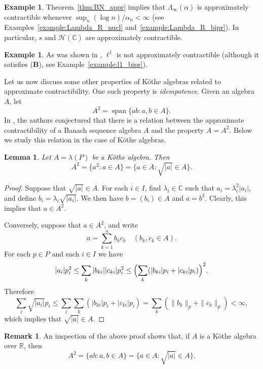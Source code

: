 \documentclass[12pt,reqno]{amsart}
\newtheorem{lemma}[theorem]{Lemma}
\theoremstyle{definition}
\newtheorem{example}[theorem]{Example}
\newtheorem{remark}[theorem]{Remark}
\begin{document}
\begin{example}
Theorem~\ref{thm:BN_appr} implies that
$\Lambda_\infty(\alpha)$ is approximately contractible whenever
$\sup_n (\log n)/\alpha_n<\infty$
(see Examples~\ref{example:Lambda_R_nucl} and~\ref{example:Lambda_R_bipr}).
In particular, $s$ and ${\mathscr H}({\mathbb C})$ are approximately contractible.
\end{example}

\begin{example}
As was shown in \cite{DLZ}, $\ell^1$ is not approximately contractible
(although it satisfies ({\textbf{B}}), see Example~\ref{example:l1_bipr}).
\end{example}

Let us now discuss some other properties of K\"othe algebras
related to approximate contractibility. One such property
is {\em idempotence}. Given an algebra $A$, let
\[
A^2=\operatorname{span}\{ ab : a,b\in A\}.
\]
In \cite{DLZ}, the authors conjectured that there is a relation
between the approximate contractibility of a Banach sequence algebra $A$
and the property $A=A^2$. Below we study this relation in the case
of K\"othe algebras.

\begin{lemma}
\label{lemma:A=A^2}
Let $A=\lambda(P)$ be a K\"othe algebra. Then
\[
A^2=\{ a^2 : a\in A\}=\{ a\in A : \sqrt{|a|}\in A\}.
\]
\end{lemma}
\begin{proof}
Suppose that $\sqrt{|a|}\in A$. For each $i\in I$, find $\lambda_i\in{\mathbb C}$
such that $a_i=\lambda_i^2 |a_i|$, and define $b_i=\lambda_i\sqrt{|a_i|}$.
We then have $b=(b_i)\in A$ and $a=b^2$. Clearly, this implies that $a\in A^2$.

Conversely, suppose that $a\in A^2$, and write
\[
a=\sum_{k=1}^n b_k c_k\quad (b_k,c_k\in A).
\]
For each $p\in P$ and each $i\in I$ we have
\[
|a_i|p_i^2
\le \sum_k |b_{ki}| |c_{ki}| p_i^2
\le \Bigl(\sum_k (|b_{ki}| p_i + |c_{ki}| p_i)\Bigr)^2.
\]
Therefore
\[
\sum_i \sqrt{|a_i|} p_i
\le\sum_i\sum_k (|b_{ki}|p_i + |c_{ki}|p_i)
=\sum_k (\| b_k\|_p+\| c_k\|_p)<\infty,
\]
which implies that $\sqrt{|a|}\in A$.
\end{proof}

\begin{remark}
An inspection of the above proof shows that, if $A$ is a K\"othe algebra
over ${\mathbb R}$, then
\[
A^2=\{ ab : a,b\in A\}=\{ a\in A : \sqrt{|a|}\in A\}.
\]
\end{remark}
\end{document}
